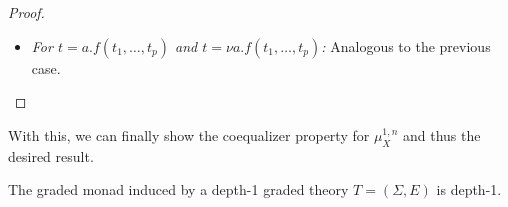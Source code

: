 \documentclass[a4paper,UKenglish,cleveref,thm-restate,numberwithinsect,final]{lipics-v2021}
\newcommand{\sig}{\Sigma}
\theoremstyle{plain}
\numberwithin{equation}{section}
\newcommand{\+}[1]{\mathcal{#1}\xspace}
\theoremstyle{definition}
\begin{document}
\begin{proof}
\begin{enumerate}[wide]
\begin{itemize}
                    For \(d(f) = 1\), we have
                    \begin{align*}
                        &q([s^n_X(t\sigma)]_1) \\
                        =~&q([s^n_X(f(t_1\sigma, \ldots, t_p\sigma))]_1) && \text{definition} \\
                        =~&q([f([t_1\sigma]_n, \ldots, [t_p\sigma]_n)]_1) && \text{definition of } s^n_X \\
                        =~&q([f(\mu^{0, n}_X([t_1 \bar{\sigma}]_0), \ldots, \mu^{0, n}_X([t_p \bar{\sigma}]_0)]))]_1) && \text{\cref{thm:multiplicationsubstitution}} \\
                        =~&q([f(t_1 \bar{\sigma}, \ldots, t_p \bar{\sigma})]_1) && \text{\eqref{itm:coequalizerpropertiesdepth1}} \\
                        =~&q([t\bar{\sigma}]_1) && \text{definition}.
                    \end{align*}
                \item
                    \textit{For \(t = a.f(t_1, \ldots, t_p)\) and \(t = \nu a.f(t_1, \ldots, t_p)\):}
                    Analogous to the previous case.
            \end{itemize}
    \end{enumerate}

\end{proof}

With this, we can finally show the coequalizer property for \(\mu^{1, n}_X\) and thus the desired result.

\begin{theorem}
    The graded monad induced by a depth-1 graded theory \(T = (\sig, E)\) is depth-1.
\end{theorem}
\end{document}
